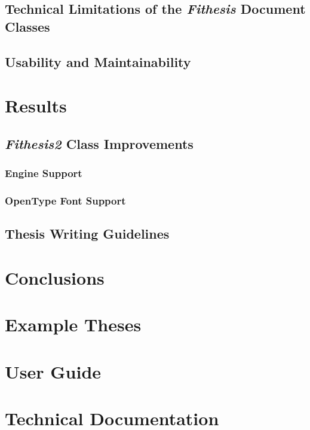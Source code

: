 \documentclass{article}
\begin{document}

  \subsection{Technical Limitations of the \emph{Fithesis} Document Classes}
  \subsection{Usability and Maintainability}
  \section{Results}
  \subsection{\emph{Fithesis2} Class Improvements}
  \subsubsection{ Engine Support}
  \subsubsection{OpenType Font Support}
  \subsection{Thesis Writing Guidelines}
  \section{Conclusions}
  \appendix
  \section{Example Theses}
  \section{User Guide}
  \section{Technical Documentation}

  \newpage
  {\footnotesize
  \singlespacing
  \nocite{*}
  }

  \newpage
  \printglossaries

  \printindex
\end{document}
